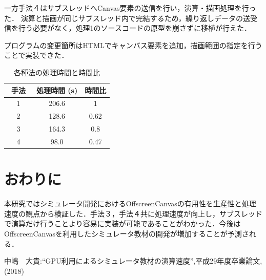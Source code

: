 \documentclass[twocolumn,10pt,a4j]{jsarticle}
\begin{document}
一方手法４はサブスレッドへCanvas要素の送信を行い，演算・描画処理を行った．
演算と描画が同じサブスレッド内で完結するため，繰り返しデータの送受信を行う必要がなく，処理1のソースコードの原型を崩さずに移植が行えた．

プログラムの変更箇所はHTMLでキャンバス要素を追加，描画範囲の指定を行うことで実装できた．

\begin{table} [htbp]
\vspace{6pt}
\centering
\caption{各種法の処理時間と時間比}
\vspace{4pt}
	\begin{tabular} {| c | c | c | } \hline
	手法　& 処理時間  (s)  & 時間比 \\ \hline
	1 & 206.6 & 1 \\ \hline 
	2 & 128.6 & 0.62 \\ \hline
	3 & 164.3 & 0.8 \\ \hline
	4 & 98.0 & 0.47 \\ \hline
	\end{tabular} 
	\label{tab:tab2}
\end{table}

\section{おわりに}
本研究ではシミュレータ開発におけるOffscreenCanvasの有用性を生産性と処理速度の観点から検証した．手法３，手法４共に処理速度が向上し，サブスレッドで演算だけ行うことより容易に実装が可能であることがわかった．今後はOffscreenCanvasを利用したシミュレータ教材の開発が増加することが予測される．
\begin{thebibliography}{99}

	中嶋　大貴:``GPU利用によるシミュレータ教材の演算速度'',平成29年度卒業論文,(2018)
\end{thebibliography}
\end{document}

